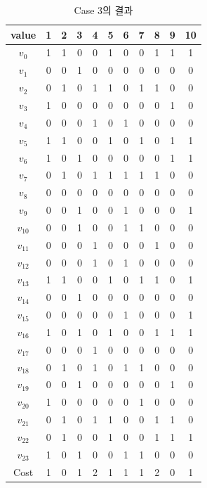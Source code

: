 \documentclass{article}
\begin{document}
    \begin{table}[htb!]
    \centering
    \begin{tabular}{c | c c c c c c c c c c}
        \hline
        value & 1 & 2 & 3 & 4 & 5 & 6 & 7 & 8 & 9 & 10 \\
        \hline
        $v_0$ & 1 & 1 & 0 & 0 & 1 & 0 & 0 & 1 & 1 & 1 \\
        $v_1$ & 0 & 0 & 1 & 0 & 0 & 0 & 0 & 0 & 0 & 0 \\
        $v_2$ & 0 & 1 & 0 & 1 & 1 & 0 & 1 & 1 & 0 & 0 \\
        $v_3$ & 1 & 0 & 0 & 0 & 0 & 0 & 0 & 0 & 1 & 0 \\
        $v_4$ & 0 & 0 & 0 & 1 & 0 & 1 & 0 & 0 & 0 & 0 \\
        $v_5$ & 1 & 1 & 0 & 0 & 1 & 0 & 1 & 0 & 1 & 1 \\
        $v_6$ & 1 & 0 & 1 & 0 & 0 & 0 & 0 & 0 & 1 & 1 \\
        $v_7$ & 0 & 1 & 0 & 1 & 1 & 1 & 1 & 1 & 0 & 0 \\
        $v_8$ & 0 & 0 & 0 & 0 & 0 & 0 & 0 & 0 & 0 & 0 \\
        $v_9$ & 0 & 0 & 1 & 0 & 0 & 1 & 0 & 0 & 0 & 1 \\
        $v_{10}$ & 0 & 0 & 1 & 0 & 0 & 1 & 1 & 0 & 0 & 0 \\
        $v_{11}$ & 0 & 0 & 0 & 1 & 0 & 0 & 0 & 1 & 0 & 0 \\
        $v_{12}$ & 0 & 0 & 0 & 1 & 0 & 1 & 0 & 0 & 0 & 0 \\
        $v_{13}$ & 1 & 1 & 0 & 0 & 1 & 0 & 1 & 1 & 0 & 1 \\
        $v_{14}$ & 0 & 0 & 1 & 0 & 0 & 0 & 0 & 0 & 0 & 0 \\
        $v_{15}$ & 0 & 0 & 0 & 0 & 0 & 1 & 0 & 0 & 0 & 1 \\
        $v_{16}$ & 1 & 0 & 1 & 0 & 1 & 0 & 0 & 1 & 1 & 1 \\
        $v_{17}$ & 0 & 0 & 0 & 1 & 0 & 0 & 0 & 0 & 0 & 0 \\
        $v_{18}$ & 0 & 1 & 0 & 1 & 0 & 1 & 1 & 0 & 0 & 0 \\
        $v_{19}$ & 0 & 0 & 1 & 0 & 0 & 0 & 0 & 0 & 1 & 0 \\
        $v_{20}$ & 1 & 0 & 0 & 0 & 0 & 0 & 1 & 0 & 0 & 0 \\
        $v_{21}$ & 0 & 1 & 0 & 1 & 1 & 0 & 0 & 1 & 1 & 0 \\
        $v_{22}$ & 0 & 1 & 0 & 0 & 1 & 0 & 0 & 1 & 1 & 1 \\
        $v_{23}$ & 1 & 0 & 1 & 0 & 0 & 1 & 1 & 0 & 0 & 0 \\
        \hline
        Cost & 1 & 0 & 1 & 2 & 1 & 1 & 1 & 2 & 0 & 1 \\
        \hline
    \end{tabular}
    \caption{Case 3의 결과}
    \label{tab:result3}
    \end{table}
\end{document}
